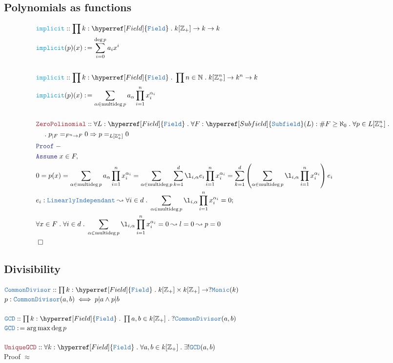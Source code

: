 \documentclass[12pt]{article}
\newcommand{\TYPE}[1]{\textcolor{NavyBlue}{\mathtt{#1}}}
\newcommand{\FUNC}[1]{\textcolor{Cerulean}{\mathtt{#1}}}
\newcommand{\LOGIC}[1]{\textcolor{Blue}{\mathtt{#1}}}
\newcommand{\THM}[1]{\textcolor{Maroon}{\mathtt{#1}}}
\renewcommand{\.}{\; . \;}
\newcommand{\de}{: \kern 0.1pc =}
\newcommand{\NNInt}{\mathbb{Z}_{+} }
\newcommand{\Nat}{\mathbb{N} }
\DeclareMathOperator*{\argmax}{arg\,max}
\newcommand{\A}{\LOGIC{Assume} \;}
\newcommand{\QED}{\; \square}
\newcommand{\Proof}{\LOGIC{Proof} \; }
\newcommand{\LInd}{\TYPE{LinearlyIndependant}}
\newcommand{\Field}{\hyperref[Field]{\TYPE{Field}}}
\newcommand{\Subfield}{\hyperref[Subfield]{\TYPE{Subfield}}}
\begin{document}
\subsection{Polynomials as functions}
\begin{align*}
&\FUNC{implicit} :: \prod k :  \Field \. k[\NNInt] \to  k \to k\\
&\FUNC{implicit}(p)(x) \de \sum^{\deg p}_{i = 0} a_ix^i 
\\ \\
  &\FUNC{implicit} :: \prod k :  \Field \. \prod n \in \Nat \. k[\NNInt^n] \to  k^n \to k\\
&\FUNC{implicit}(p)(x) \de \sum_{\alpha \in \mathrm{multideg} \,p} a_\alpha \prod^n_{i=1}x_i^{\alpha_i} 
\\ \\
\label{ZPTHM}
&\THM{ZeroPolinomial} :: \forall L : \Field \. \forall F : \Subfield(L) : \#F \ge \aleph_0 \. \forall p \in  L[\NNInt^n] \. \\
& \quad \. p_{|F} =_{F^n \to F} 0 \Rightarrow p =_{L[\NNInt^n]} 0 \\
& \Proof - \\
& \A x \in F, \\
& 0 = p(x) = \sum_{\alpha \in \mathrm{multideg} \,p} a_\alpha \prod^n_{i=1}x_i^{\alpha_i} =
 \sum_{\alpha \in \mathrm{multideg} \,p} \sum^d_{k=1} \l_{i,\alpha}e_i \prod^n_{i=1}x_i^{\alpha_i} = 
   \sum^d_{k=1} \left (   \sum_{\alpha \in \mathrm{multideg} \,p}        
      \l_{i,\alpha} \prod^n_{i=1}x_i^{\alpha_i}
   \right )  e_i        \\
   & e_i : \LInd \leadsto \forall i \in d \. 
   \sum_{\alpha \in \mathrm{multideg} \,p}        
      \l_{i,\alpha} \prod^n_{i=1}x_i^{\alpha_i} = 0  ; \\
    & \forall x \in F \. \forall i \in d \. 
   \sum_{\alpha \in \mathrm{multideg} \,p}        
      \l_{i,\alpha} \prod^n_{i=1}x_i^{\alpha_i} = 0   
      \leadsto l = 0
       \leadsto p = 0 \\
      & \QED 
\end{align*}
\newpage
\subsection{Divisibility}
$\TYPE{CommonDivisor} :: \prod k : \Field \. k[\NNInt]\times k[\NNInt] \to ?
\TYPE{Monic}(k)$
\\
$ p :   \TYPE{CommonDivisor}(a,b) \iff p | a \wedge p | b           $
\\ \\
$\TYPE{GCD} :: \prod k : \Field \. \prod a,b \in k[\NNInt] \. ?\TYPE{CommonDivisor}(a,b)$
\\
$ \TYPE{GCD} \de \argmax \deg p $
\\ \\
$\THM{UniqueGCD} :: \forall k : \Field \. \forall a,b \in k[\NNInt] \. \exists ! \TYPE{GCD}(a,b)  $ \\
Proof $\approx$ \\
\end{document}
